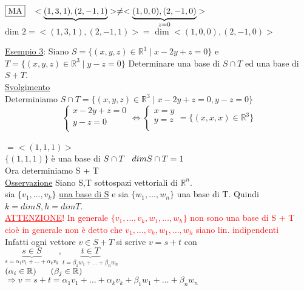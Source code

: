 $\boxed{\text{MA}} \hspace{0.3cm} <\underbrace{(1,3,1),(2,-1,1)}> \neq <\underbrace{(1,0,0),(2,-1,0)} _{z = 0}>$ \\

$\text{dim } 2 = <(1,3,1),(2,-1,1)> = \text{ dim } <(1,0,0),(2,-1,0)>$\\

\flushleft

\textsf{\underline{Esempio 3}: Siano $S = \{ (x,y,z) \in \mathbb{R}^3 \mid x - 2y + z = 0\}$ e $ T = \{ (x,y,z) \in \mathbb{R}^3 \mid y - z = 0\}$ Determinare una base di $S \cap T$ ed una base di $ S + T$.}\\

\textsf{\underline{Svolgimento}}\\

\textsf{\small Determiniamo } $S \cap T = \{ (x,y,z) \in \mathbb{R}^3 \mid x - 2y + z = 0, y - z = 0\}$\\

\[
\begin{cases*}
	x - 2y + z = 0 \\
	y - z = 0 \\
\end{cases*}
\Leftrightarrow
\begin{cases*}
	x = y \\
	y = z \\
\end{cases*}
= \{ (x,x,x) \in \mathbb{R}^3\}
\]\\
$=<(1,1,1)>$\\
$\{ (1,1,1)\}$ \textsf{\small è una base di $S \cap T \hspace{0.3cm} dim S \cap T = 1$}\\
\textsf{\small Ora determiniamo S + T}\\
\textsf{\underline{Osservazione}} \textsf{\small Siano S,T sottospazi vettoriali di $\mathbb{R}^n$.}\\
\textsf{\small sia $\{ v_1, \dots, v_k\}$ \color{ForestGreen}\underline{\normalcolor una base di S} \normalcolor e sia $\{ w_1, \dots, w_n\}$ una base di T. Quindi $ k = dim S, h = dim T$.}\\
\textcolor{red}{\underline{ATTENZIONE}! In generale $\{ v_1, \dots, v_k, w_1, \dots, w_h\}$ $\boxed{\text{non}}$ sono una base di S + T cioè in generale non è detto che $v_1, \dots, v_k, w_1, \dots, w_h$ siano lin. indipendenti}\\
\textsf{\small Infatti ogni vettore $v \in S + T$ si scrive $ v = s + t$ con}\\
\(
\underbrace{s \in S} _{s = \alpha_1 v_1 + \dots + \alpha_k v_k}, \underbrace{t \in T} _{t = \beta_1 w_1 + \dots + \beta_n w_n}
\)\\
$(\alpha_i \in \mathbb{R}) \hspace{0.6cm} (\beta_j \in \mathbb{R})$\\
$\Rightarrow v = s + t = \alpha_1 v_1 + \dots + \alpha_k v_k + \beta_1 w_1 + \dots + \beta_n w_n$\\


